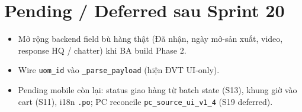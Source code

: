 \section{Pending / Deferred sau Sprint 20}

\begin{itemize}
  \item Mở rộng backend field bù hàng thật (Đã nhận, ngày mở-sản xuất, video, response HQ /
        chatter) khi BA build Phase 2.
  \item Wire \texttt{uom\_id} vào \texttt{\_parse\_payload} (hiện ĐVT UI-only).
  \item Pending mobile còn lại: status giao hàng từ batch state (S13), khung giờ vào cart (S11),
        i18n \texttt{.po}; PC reconcile \texttt{pc\_source\_ui\_v1\_4} (S19 deferred).
\end{itemize}

